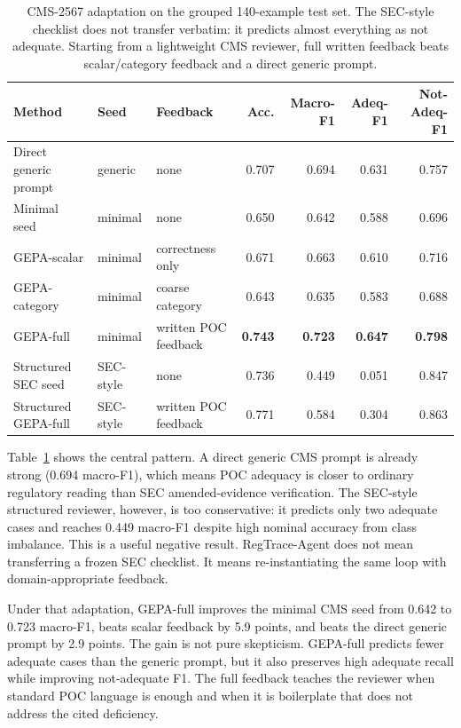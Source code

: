 \documentclass[11pt]{article}
\newcommand{\framework}{RegTrace-Agent}
\begin{document}
\begin{table}[t]
\centering
\small
\begin{tabular}{lllrrrr}
\toprule
\textbf{Method} & \textbf{Seed} & \textbf{Feedback} & \textbf{Acc.} & \textbf{Macro-F1} & \textbf{Adeq-F1} & \textbf{Not-Adeq-F1} \\
\midrule
Direct generic prompt & generic & none & 0.707 & 0.694 & 0.631 & 0.757 \\
Minimal seed & minimal & none & 0.650 & 0.642 & 0.588 & 0.696 \\
GEPA-scalar & minimal & correctness only & 0.671 & 0.663 & 0.610 & 0.716 \\
GEPA-category & minimal & coarse category & 0.643 & 0.635 & 0.583 & 0.688 \\
GEPA-full & minimal & written POC feedback & \textbf{0.743} & \textbf{0.723} & \textbf{0.647} & \textbf{0.798} \\
\midrule
Structured SEC seed & SEC-style & none & 0.736 & 0.449 & 0.051 & 0.847 \\
Structured GEPA-full & SEC-style & written POC feedback & 0.771 & 0.584 & 0.304 & 0.863 \\
\bottomrule
\end{tabular}
\caption{CMS-2567 adaptation on the grouped 140-example test set. The SEC-style checklist does not transfer verbatim: it predicts almost everything as not adequate. Starting from a lightweight CMS reviewer, full written feedback beats scalar/category feedback and a direct generic prompt.}
\label{tab:cms}
\end{table}

Table~\ref{tab:cms} shows the central pattern. A direct generic CMS prompt is already strong (0.694 macro-F1), which means POC adequacy is closer to ordinary regulatory reading than SEC amended-evidence verification. The SEC-style structured reviewer, however, is too conservative: it predicts only two adequate cases and reaches 0.449 macro-F1 despite high nominal accuracy from class imbalance. This is a useful negative result. \framework{} does not mean transferring a frozen SEC checklist. It means re-instantiating the same loop with domain-appropriate feedback.

Under that adaptation, GEPA-full improves the minimal CMS seed from 0.642 to 0.723 macro-F1, beats scalar feedback by 5.9 points, and beats the direct generic prompt by 2.9 points. The gain is not pure skepticism. GEPA-full predicts fewer adequate cases than the generic prompt, but it also preserves high adequate recall while improving not-adequate F1. The full feedback teaches the reviewer when standard POC language is enough and when it is boilerplate that does not address the cited deficiency.
\end{document}
